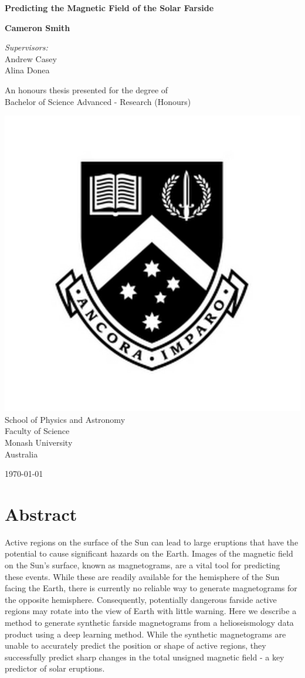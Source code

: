 \documentclass[11pt,a4paper,onecolumn]{report}
\begin{document}
\begin{titlepage}
  \begin{center}
    \vspace*{2cm}
    \Huge
    \textbf{Predicting the Magnetic Field of the Solar Farside}

    \vspace{2cm}
    \LARGE
    \textbf{Cameron Smith}

    \vspace{0.8cm}
    \Large \textit{Supervisors:}\\
    Andrew Casey\\
    Alina Donea

    \vfill
    \large
    An honours thesis presented for the degree of\\
    Bachelor of Science Advanced - Research (Honours)

    \vspace{0.3cm}
    \includegraphics[width=0.2\linewidth]{"Monash_Logo"}\\
    School of Physics and Astronomy\\
    Faculty of Science\\
    Monash University\\
    Australia

    \vspace{0.5cm}

    \today

  \end{center}
\end{titlepage}

\chapter*{Abstract}
Active regions on the surface of the Sun can lead to large eruptions that have
the potential to cause significant hazards on the Earth. Images of the magnetic
field on the Sun's surface, known as magnetograms, are a vital tool for
predicting these events. While these are readily available for the hemisphere of
the Sun facing the Earth, there is currently no reliable way to generate
magnetograms for the opposite hemisphere. Consequently, potentially dangerous farside
active regions may rotate into the view of Earth with little warning. Here we
describe a method to generate synthetic farside magnetograms from a helioseismology data
product using a deep learning method. While the synthetic magnetograms are
unable to accurately predict the position or shape of active regions, they
successfully predict sharp changes in the total unsigned magnetic field - a key
predictor of solar eruptions.
\end{document}
